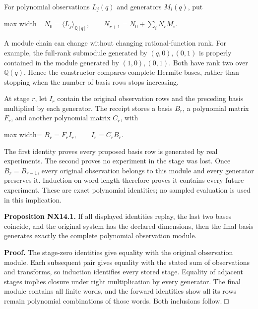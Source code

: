 \documentclass[
  11pt,
  a4paper,
]{report}
\begin{document}
For polynomial observations \(L_j(q)\) and generators \(M_i(q)\), put

\begin{center}
\begin{adjustbox}{max width=\linewidth}
$\displaystyle
 N_0=\langle L_j\rangle_{\mathbb Q[q]},\qquad
 N_{r+1}=N_0+\sum_iN_rM_i.
$
\end{adjustbox}
\end{center}

A module chain can change without changing rational-function rank. For
example, the full-rank submodule generated by \((q,0),(0,1)\) is
properly contained in the module generated by \((1,0),(0,1)\). Both have
rank two over \(\mathbb Q(q)\). Hence the constructor compares complete
Hermite bases, rather than stopping when the number of basis rows stops
increasing.

At stage \(r\), let \(I_r\) contain the original observation rows and
the preceding basis multiplied by each generator. The receipt stores a
basis \(B_r\), a polynomial matrix \(F_r\), and another polynomial
matrix \(C_r\), with

\begin{center}
\begin{adjustbox}{max width=\linewidth}
$\displaystyle
 B_r=F_r I_r,\qquad I_r=C_rB_r.
$
\end{adjustbox}
\end{center}

The first identity proves every proposed basis row is generated by real
experiments. The second proves no experiment in the stage was lost. Once
\(B_r=B_{r-1}\), every original observation belongs to this module and
every generator preserves it. Induction on word length therefore proves
it contains every future experiment. These are exact polynomial
identities; no sampled evaluation is used in this implication.

\textbf{Proposition NX14.1.} If all displayed identities replay, the
last two bases coincide, and the original system has the declared
dimensions, then the final basis generates exactly the complete
polynomial observation module.

\textbf{Proof.} The stage-zero identities give equality with the
original observation module. Each subsequent pair gives equality with
the stated sum of observations and transforms, so induction identifies
every stored stage. Equality of adjacent stages implies closure under
right multiplication by every generator. The final module contains all
finite words, and the forward identities show all its rows remain
polynomial combinations of those words. Both inclusions follow. □
\end{document}
